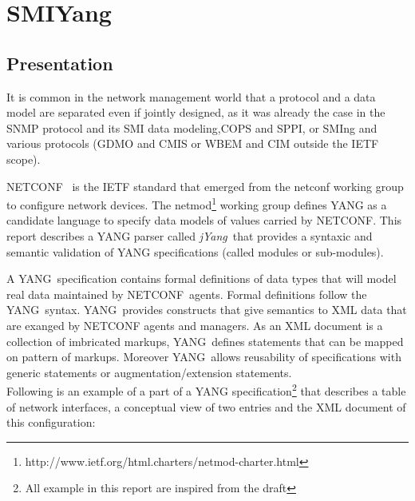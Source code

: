 \documentclass[a4paper]{article}
\begin{document}
\section{SMIYang}
\label{sec:smiyang}

\lstset{numbers=left, numberstyle=\tiny, stepnumber=1, numbersep=5pt}

\subsection{Presentation}


It is  common in the  network management world  that a protocol  and a
data model are  separated even if jointly designed,  as it was already
the case in the  SNMP\cite{rfc1157} protocol and its SMI\cite{rfc1442}
data   modeling,CO\-PS\cite{rfc2748}   and  SP\-PI\cite{rfc3159},   or
SMI\-ng and  various protocols \cite{rfc3780}  (GDMO and CMIS  or WBEM
and CIM outside the IETF scope).

NETCONF\  \cite{rfc4741} is the  IETF standard  that emerged  from the
netconf   working   group   to   configure   network   devices.    The
netmod\footnote{http://www.ietf.org/html.charters/netmod-charter.html}
working group  defines YANG \cite{yang01}  as a candidate  language to
specify  data  models  of  values  carried by  NETCONF.   This  report
describes a YANG parser called {\sl jYang\/}\ that provides a syntaxic
and  semantic validation  of  YANG specifications  (called modules  or
sub-modules).

A YANG\  specification contains formal definitions of  data types that
will  model   real  data   maintained  by  NETCONF\   agents.   Formal
definitions follow  the YANG\  syntax. YANG\ provides  constructs that
give  semantics to XML  data that  are exanged  by NETCONF  agents and
managers.  As an  XML document is a collection  of imbricated markups,
YANG\ defines  statements that  can be mapped  on pattern  of markups.
Moreover  YANG\  allows  reusability  of specifications  with  generic
statements or augmentation/extension statements.\\

Following is an example of  a part of a YANG specification\footnote{All
example in  this report are  inspired from the  draft\cite{yang01}} that
describes  a table  of network  interfaces, a  conceptual view  of two
entries and the XML document of this configuration:\\
\end{document}
